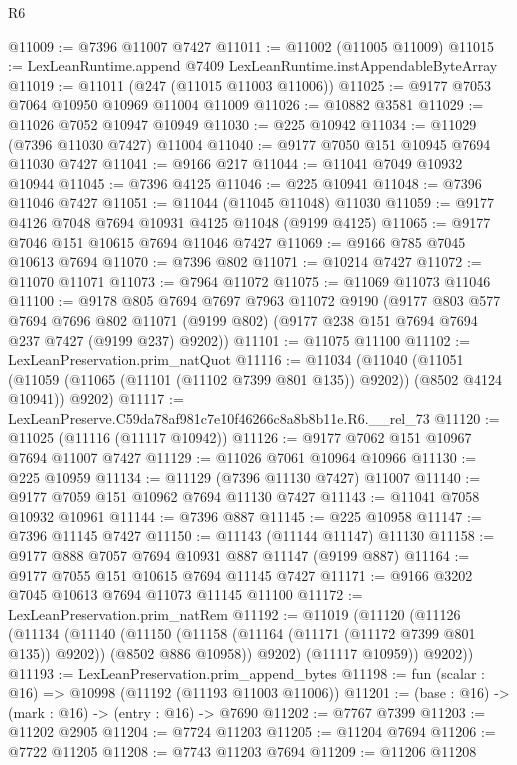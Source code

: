 \begin{lexlean}{R6}
\begin{coremodule}
@11009 := @7396 @11007 @7427
@11011 := @11002 (@11005 @11009)
@11015 := LexLeanRuntime.append @7409 LexLeanRuntime.instAppendableByteArray
@11019 := @11011 (@247 (@11015 @11003 @11006))
@11025 := @9177 @7053 @7064 @10950 @10969 @11004 @11009
@11026 := @10882 @3581
@11029 := @11026 @7052 @10947 @10949
@11030 := @225 @10942
@11034 := @11029 (@7396 @11030 @7427) @11004
@11040 := @9177 @7050 @151 @10945 @7694 @11030 @7427
@11041 := @9166 @217
@11044 := @11041 @7049 @10932 @10944
@11045 := @7396 @4125
@11046 := @225 @10941
@11048 := @7396 @11046 @7427
@11051 := @11044 (@11045 @11048) @11030
@11059 := @9177 @4126 @7048 @7694 @10931 @4125 @11048 (@9199 @4125)
@11065 := @9177 @7046 @151 @10615 @7694 @11046 @7427
@11069 := @9166 @785 @7045 @10613 @7694
@11070 := @7396 @802
@11071 := @10214 @7427
@11072 := @11070 @11071
@11073 := @7964 @11072
@11075 := @11069 @11073 @11046
@11100 := @9178
    @805
    @7694
    @7697
    @7963
    @11072
    @9190
    (@9177
      @803
      @577
      @7694
      @7696
      @802
      @11071
      (@9199 @802)
      (@9177 @238 @151 @7694 @7694 @237 @7427 (@9199 @237) @9202))
@11101 := @11075 @11100
@11102 := LexLeanPreservation.prim_natQuot
@11116 := @11034
    (@11040
      (@11051 (@11059 (@11065 (@11101 (@11102 @7399 @801 @135)) @9202)) (@8502 @4124 @10941))
      @9202)
@11117 := LexLeanPreserve.C59da78af981c7e10f46266c8a8b8b11e.R6.__rel_73
@11120 := @11025 (@11116 (@11117 @10942))
@11126 := @9177 @7062 @151 @10967 @7694 @11007 @7427
@11129 := @11026 @7061 @10964 @10966
@11130 := @225 @10959
@11134 := @11129 (@7396 @11130 @7427) @11007
@11140 := @9177 @7059 @151 @10962 @7694 @11130 @7427
@11143 := @11041 @7058 @10932 @10961
@11144 := @7396 @887
@11145 := @225 @10958
@11147 := @7396 @11145 @7427
@11150 := @11143 (@11144 @11147) @11130
@11158 := @9177 @888 @7057 @7694 @10931 @887 @11147 (@9199 @887)
@11164 := @9177 @7055 @151 @10615 @7694 @11145 @7427
@11171 := @9166 @3202 @7045 @10613 @7694 @11073 @11145 @11100
@11172 := LexLeanPreservation.prim_natRem
@11192 := @11019
    (@11120
      (@11126
        (@11134
          (@11140
            (@11150 (@11158 (@11164 (@11171 (@11172 @7399 @801 @135)) @9202)) (@8502 @886 @10958))
            @9202)
          (@11117 @10959))
        @9202))
@11193 := LexLeanPreservation.prim_append_bytes
@11198 := fun (scalar : @16) => @10998 (@11192 (@11193 @11003 @11006))
@11201 := (base : @16) -> (mark : @16) -> (entry : @16) -> @7690
@11202 := @7767 @7399
@11203 := @11202 @2905
@11204 := @7724 @11203
@11205 := @11204 @7694
@11206 := @7722 @11205
@11208 := @7743 @11203 @7694
@11209 := @11206 @11208

\end{coremodule}
\end{lexlean}
